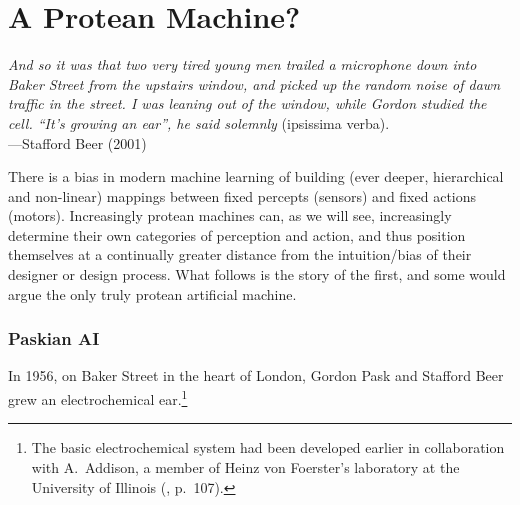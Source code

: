 \section{A Protean Machine?}

\begin{changemargin}{4em}{4em} 

\vspace{1em}

\textit{And so it was that two very tired young men trailed a microphone down into Baker Street from the upstairs window, and picked up the random noise of dawn traffic in the street. 
I was leaning out of the window, while Gordon studied the cell. 
``It's growing an ear'', he said solemnly} (ipsissima verba). \\[1em]
\hspace*{16.5em} ---Stafford Beer (2001)

\vspace{1em}

\end{changemargin}



\noindent
There is a bias in modern machine learning of building (ever deeper, hierarchical and non-linear) mappings between fixed percepts (sensors) and fixed actions (motors).
Increasingly protean machines 
can, as we will see, increasingly determine their own categories of perception and action, and thus
position themselves at a
continually greater distance from the intuition/bias of their designer or design process.
What follows is the story of the first, and some would argue the only truly protean artificial machine.


\subsubsection{Paskian AI}

In 1956, on Baker Street in the heart of London,
Gordon Pask and Stafford Beer grew an electrochemical ear.\footnote{%
The basic electrochemical system had been developed earlier in collaboration with A.~Addison,
a member of Heinz von Foerster's laboratory at the University of Illinois
(\cite{pask1961approach}, p.~107).
}






